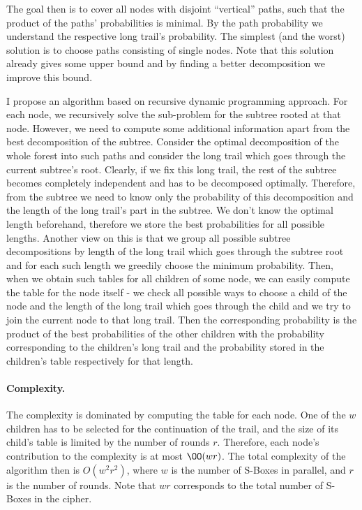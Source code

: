 The goal then is to cover all nodes with disjoint ``vertical'' paths, such that the product of the paths' probabilities is minimal. By the path probability we understand the respective long trail's probability. The simplest (and the worst) solution is to choose paths consisting of single nodes. Note that this solution already gives some upper bound and by finding a better decomposition we improve this bound.

I propose an algorithm based on recursive dynamic programming approach. For each node, we recursively solve the sub-problem for the subtree rooted at that node. However, we need to compute some additional information apart from the best decomposition of the subtree. Consider the optimal decomposition of the whole forest into such paths and consider the long trail which goes through the current subtree's root. Clearly, if we fix this long trail, the rest of the subtree becomes completely independent and has to be decomposed optimally. Therefore, from the subtree we need to know only the probability of this decomposition and the length of the long trail's part in the subtree. We don't know the optimal length beforehand, therefore we store the best probabilities for all possible lengths. Another view on this is that we group all possible subtree decompositions by length of the long trail which goes through the subtree root and for each such length we greedily choose the minimum probability. Then, when we obtain such tables for all children of some node, we can easily compute the table for the node itself - we check all possible ways to choose a child of the node and the length of the long trail which goes through the child and we try to join the current node to that long trail. Then the corresponding probability is the product of the best probabilities of the other children with the probability corresponding to the children's long trail and the probability stored in the children's table respectively for that length.

\paragraph{Complexity.}
The complexity is dominated by computing the table for each node. One of the $w$ children has to be selected for the continuation of the trail, and the size of its child's table is limited by the number of rounds $r$.
Therefore, each node's contribution to the complexity is at most $\OO(wr)$. The total complexity of the algorithm then is $O(w^2r^2)$, where $w$ is the number of S-Boxes in parallel, and $r$ is the number of rounds. Note that $wr$ corresponds to the total number of S-Boxes in the cipher.

